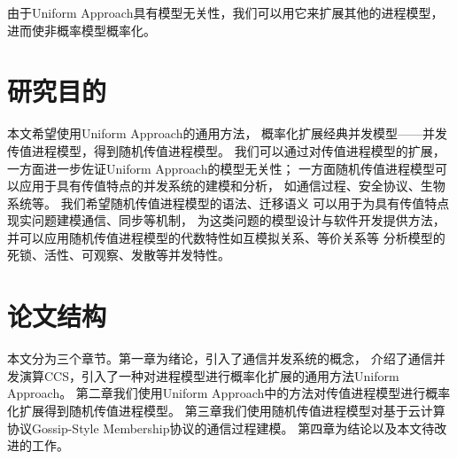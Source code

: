    由于Uniform Approach具有模型无关性，我们可以用它来扩展其他的进程模型，
   进而使非概率模型概率化。

\section{研究目的}
本文希望使用Uniform Approach的通用方法，
概率化扩展经典并发模型——并发传值进程模型，得到随机传值进程模型。
我们可以通过对传值进程模型的扩展，
一方面进一步佐证Uniform Approach的模型无关性；
一方面随机传值进程模型可以应用于具有传值特点的并发系统的建模和分析，
如通信过程、安全协议、生物系统等。
我们希望随机传值进程模型的语法、迁移语义
可以用于为具有传值特点现实问题建模通信、同步等机制，
为这类问题的模型设计与软件开发提供方法，
并可以应用随机传值进程模型的代数特性如互模拟关系、等价关系等
分析模型的死锁、活性、可观察、发散等并发特性。

\section{论文结构}
本文分为三个章节。第一章为绪论，引入了通信并发系统的概念，
介绍了通信并发演算CCS，引入了一种对进程模型进行概率化扩展的通用方法Uniform Approach。
第二章我们使用Uniform Approach中的方法对传值进程模型进行概率化扩展得到随机传值进程模型。
第三章我们使用随机传值进程模型对基于云计算协议Gossip-Style Membership协议的通信过程建模。
第四章为结论以及本文待改进的工作。
